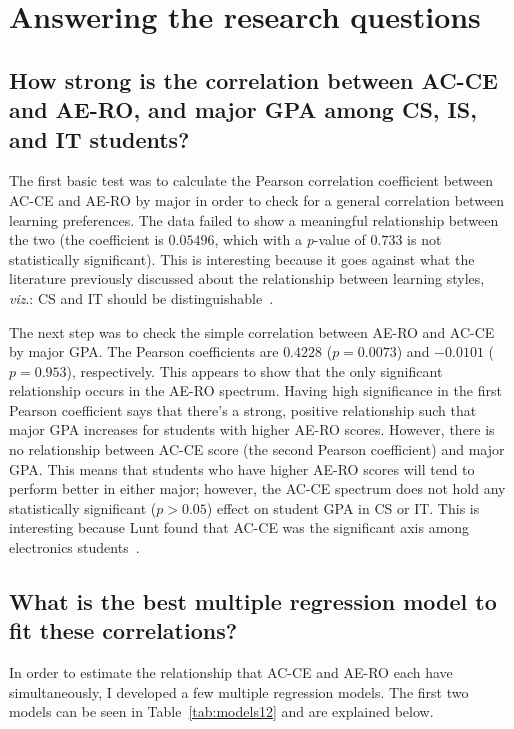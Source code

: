 \section{Answering the research questions}
\subsection{How strong is the correlation between AC-CE and AE-RO, and major GPA among CS, IS, and IT students?}
The first basic test was to calculate the Pearson correlation coefficient between AC-CE and AE-RO by major in order to check for a general correlation between learning preferences. The data failed to show a meaningful relationship between the two (the coefficient is $0.05496$, which with a \textit{p}-value of $0.733$ is not statistically significant). This is interesting because it goes against what the literature previously discussed about the relationship between learning styles, \textit{viz}.: CS and IT should be distinguishable~\citep{kolb2005b}.

The next step was to check the simple correlation between AE-RO and AC-CE by major GPA. The Pearson coefficients are $0.4228$ ($p=0.0073$) and $-0.0101$ ($p=0.953$), respectively. This appears to show that the only significant relationship occurs in the AE-RO spectrum. Having high significance in the first Pearson coefficient says that there's a strong, positive relationship such that major GPA increases for students with higher AE-RO scores. However, there is no relationship between AC-CE score (the second Pearson coefficient) and major GPA. This means that students who have higher AE-RO scores will tend to perform better in either major; however, the AC-CE spectrum does not hold any statistically significant ($p>0.05$) effect on student GPA in CS or IT. This is interesting because Lunt found that AC-CE was the significant axis among electronics students~\citep{lunt1996}.

\subsection{What is the best multiple regression model to fit these correlations?}
In order to estimate the relationship that AC-CE and AE-RO each have simultaneously, I developed a few multiple regression models. The first two models can be seen in Table~\ref{tab:models12} and are explained below.

